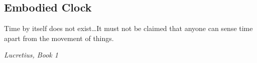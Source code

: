 





\subsection{Embodied Clock}
\label{ch:intro:Embodiment:Embodied Clock}
\epigraph{Time by itself does not exist\ldots It must not be claimed that anyone can sense time apart from the movement of things.}
{\textit{Lucretius, Book 1}}
\noindent




